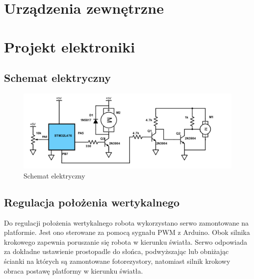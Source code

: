 \documentclass[10pt, a4paper]{article}
\begin{document}
\section{Urządzenia zewnętrzne}


\section{Projekt elektroniki}
	\subsection{Schemat elektryczny}
	\begin{figure}[H]
		\centering
		\includegraphics[width=1\textwidth]{figures/schemeit-project.png}
		\caption{Schemat elektryczny}
		\label{fig:Schemat elektryczny}
	\end{figure}
	
\subsection{Regulacja położenia wertykalnego}
Do regulacji położenia wertykalnego robota wykorzystano serwo zamontowane na platformie. Jest ono sterowane za pomocą sygnału PWM z Arduino. Obok silnika krokowego zapewnia poruszanie się robota w kierunku światła. Serwo odpowiada za dokładne ustawienie prostopadle do słońca, podwyższając lub obniżając ścianki na których są zamontowane fotorezystory, natomiast silnik krokowy obraca postawę platformy w kierunku światła.
\end{document}
